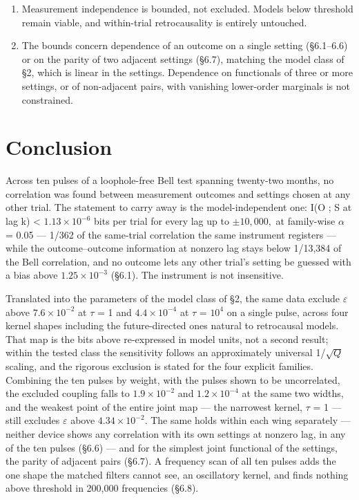 \documentclass[
  11pt,
]{article}
\begin{document}
\begin{enumerate}
  Time and calibration are confounded across the spread pulses; a
  difference could not be attributed to either. The conversion from
  trials to seconds is an upper bound and is not constant across the
  archive (\S4.1).
\item
  Measurement independence is bounded, not excluded. Models below
  threshold remain viable, and within-trial retrocausality is entirely
  untouched.
\item
  The bounds concern dependence of an outcome on a single setting
  (\S6.1--6.6) or on the parity of two adjacent settings (\S6.7),
  matching the model class of \S2, which is linear in the settings.
  Dependence on functionals of three or more settings, or of
  non-adjacent pairs, with vanishing lower-order marginals is not
  constrained.
\end{enumerate}

\section{Conclusion}

Across ten pulses of a loophole-free Bell test spanning twenty-two
months, no correlation was found between measurement outcomes and
settings chosen at any other trial. The statement to carry away is the
model-independent one: I(O ; S at lag k) \textless{}
\(1.13 \times 10^{-6}\) bits per trial for every lag up to
\(\pm 10,000,\) at family-wise \(\alpha\) = 0.05 --- 1/362 of the
same-trial correlation the same instrument registers --- while the
outcome--outcome information at nonzero lag stays below 1/13,384 of the
Bell correlation, and no outcome lets any other trial's setting be
guessed with a bias above \(1.25 \times 10^{-3}\) (\S6.1). The
instrument is not insensitive.

Translated into the parameters of the model class of \S2, the same data
exclude \(\varepsilon\) above \(7.6 \times 10^{-2}\) at \(\tau\) = 1 and
\(4.4 \times 10^{-4}\) at \(\tau\) = \(10^{4}\) on a single pulse,
across four kernel shapes including the future-directed ones natural to
retrocausal models. That map is the bits above re-expressed in model
units, not a second result; within the tested class the sensitivity
follows an approximately universal 1/\(\sqrt{Q}\) scaling, and the
rigorous exclusion is stated for the four explicit families. Combining
the ten pulses by weight, with the pulses shown to be uncorrelated, the
excluded coupling falls to \(1.9 \times 10^{-2}\) and
\(1.2 \times 10^{-4}\) at the same two widths, and the weakest point of
the entire joint map --- the narrowest kernel, \(\tau\) = 1 --- still
excludes \(\varepsilon\) above \(4.34 \times 10^{-2}\). The same holds
within each wing separately --- neither device shows any correlation
with its own settings at nonzero lag, in any of the ten pulses (\S6.6)
--- and for the simplest joint functional of the settings, the parity of
adjacent pairs (\S6.7). A frequency scan of all ten pulses adds the one
shape the matched filters cannot see, an oscillatory kernel, and finds
nothing above threshold in 200,000 frequencies (\S6.8).
\end{document}
